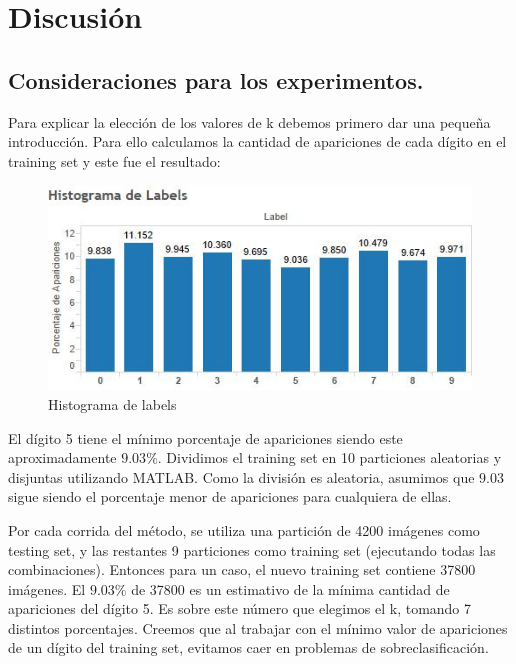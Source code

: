 \documentclass{article}
\begin{document}
\pagebreak


\section*{Discusión}{}



\subsection*{Consideraciones para los experimentos.}

Para explicar la elección de los valores de k debemos primero dar una pequeña introducción.  Para ello calculamos la cantidad de apariciones de cada dígito en el training set y este fue el resultado:

\begin{figure}[h]
\centering
\includegraphics[scale=0.80]{histo.jpg}
\caption{Histograma de labels}
\end{figure}

El dígito 5 tiene el mínimo porcentaje de apariciones siendo este aproximadamente $9.03\%$.  Dividimos el training set en 10 particiones aleatorias y disjuntas utilizando MATLAB. Como la división es aleatoria, asumimos que $9.03$ sigue siendo el porcentaje menor de apariciones para cualquiera de ellas. 

Por cada corrida del método, se utiliza una partición de 4200 imágenes como testing set, y las restantes 9 particiones como training set (ejecutando todas las combinaciones).  Entonces para un caso, el nuevo training set contiene 37800 imágenes. El $9.03\%$ de 37800 es un estimativo de la mínima cantidad de apariciones del dígito 5. Es sobre este número que elegimos el k, tomando 7 distintos porcentajes. Creemos que al trabajar con el mínimo valor de apariciones de un dígito del training set, evitamos caer en problemas de sobreclasificación.
\end{document}
